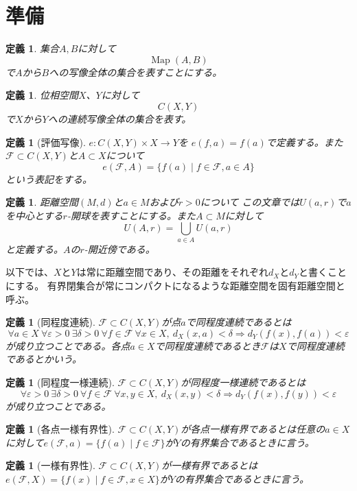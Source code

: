 \documentclass[leqno]{jsarticle}
\newtheorem{df}[thm]{定義}
\newcommand{\To}{\Longrightarrow}
\newcommand{\ep}{\varepsilon}
\DeclareMathOperator{\map}{Map}
\begin{document}
\section{準備}
\begin{df}
集合$A,B$に対して
\[
\map(A,B)
\]
で$A$から$B$への写像全体の集合を表すことにする。
\end{df}
\begin{df}
位相空間$X$、$Y$に対して
\[
C(X,Y)
\]
で$X$から$Y$への連続写像全体の集合を表す。
\end{df}
\begin{df}[評価写像]
$e:C(X,Y)\times X\to Y$を
$e(f,a)=f(a)$で定義する。また$\mathcal{F}\subset C(X,Y)$と$A\subset X$について
\[
e(\mathcal{F}, A)=\{f(a)\mid f\in \mathcal{F}, a\in A\}
\]
という表記をする。
\end{df}
\begin{df}
距離空間$(M,d)$と$a\in M$および$r>0$について
この文章では$U(a,r)$で$a$を中心とする$r$-開球を表すことにする。また$A\subset M$に対して
\[
U(A, r)=\bigcup_{a\in A}U(a,r)
\]
と定義する。$A$の$r$-開近傍である。
\end{df}
以下では、$X$と$Y$は常に距離空間であり、その距離をそれぞれ$d_X$と$d_Y$と書くことにする。
有界閉集合が常にコンパクトになるような距離空間を固有距離空間と呼ぶ。
\begin{df}[同程度連続]
$\mathcal{F}\subset C(X,Y)$が点$a$で同程度連続であるとは
\[
\forall a\in X\ \forall \ep>0\ \exists \delta>0\ \forall f\in \mathcal{F}\ \forall x\in X,\ d_X(x,a)<\delta\To  d_Y(f(x),f(a))<\ep
\]
が成り立つことである。各点$a\in X$で同程度連続であるとき$\mathcal{F}$は$X$で同程度連続であるとかいう。
\end{df}
\begin{df}[同程度一様連続]
$\mathcal{F}\subset C(X,Y)$が同程度一様連続であるとは
\[
\forall \ep>0\ \exists \delta>0\ \forall f\in \mathcal{F}\ \forall x,y\in X,\ d_X(x,y)<\delta\To d_Y(f(x),f(y))<\ep
\]
が成り立つことである。
\end{df}
\begin{df}[各点一様有界性]
$\mathcal{F}\subset C(X,Y)$が各点一様有界であるとは任意の$a\in X$に対して$e(\mathcal{F}, a)=\{f(a)\mid f\in \mathcal{F}\}$が$Y$の有界集合であるときに言う。
\end{df}

\begin{df}[一様有界性]
$\mathcal{F}\subset C(X,Y)$が一様有界であるとは$e(\mathcal{F}, X)=\{f(x)\mid f\in \mathcal{F}, x\in X\}$が$Y$の有界集合であるときに言う。
\end{df}
\end{document}
